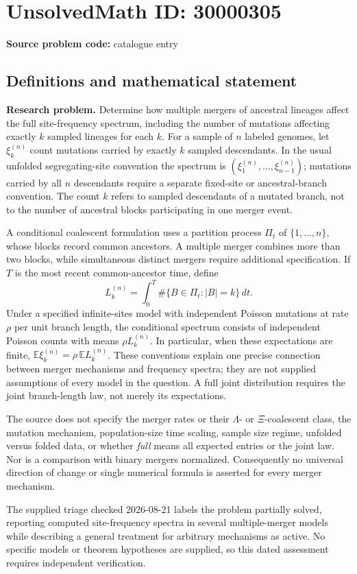 \documentclass[11pt]{article}
\begin{document}
\section*{UnsolvedMath ID: 30000305}
\textbf{Source problem code:} catalogue entry
\subsection{Definitions and mathematical statement}
\textbf{Research problem.} Determine how multiple mergers of ancestral lineages affect the full site-frequency spectrum, including the number of mutations affecting exactly \(k\) sampled lineages for each \(k\). For a sample of \(n\) labeled genomes, let \(\xi_k^{(n)}\) count mutations carried by exactly \(k\) sampled descendants. In the usual unfolded segregating-site convention the spectrum is \((\xi_1^{(n)},\ldots,\xi_{n-1}^{(n)})\); mutations carried by all \(n\) descendants require a separate fixed-site or ancestral-branch convention. The count \(k\) refers to sampled descendants of a mutated branch, not to the number of ancestral blocks participating in one merger event.\par A conditional coalescent formulation uses a partition process \(\Pi_t\) of \(\{1,\ldots,n\}\), whose blocks record common ancestors. A multiple merger combines more than two blocks, while simultaneous distinct mergers require additional specification. If \(T\) is the most recent common-ancestor time, define\[L_k^{(n)}=\int_0^T\#\{B\in\Pi_t:|B|=k\}\,dt.\] Under a specified infinite-sites model with independent Poisson mutations at rate \(\rho\) per unit branch length, the conditional spectrum consists of independent Poisson counts with means \(\rho L_k^{(n)}\). In particular, when these expectations are finite, \(\mathbb E\xi_k^{(n)}=\rho\,\mathbb E L_k^{(n)}\). These conventions explain one precise connection between merger mechanisms and frequency spectra; they are not supplied assumptions of every model in the question. A full joint distribution requires the joint branch-length law, not merely its expectations.\par The source does not specify the merger rates or their \(\Lambda\)- or \(\Xi\)-coalescent class, the mutation mechanism, population-size time scaling, sample size regime, unfolded versus folded data, or whether \emph{full} means all expected entries or the joint law. Nor is a comparison with binary mergers normalized. Consequently no universal direction of change or single numerical formula is asserted for every merger mechanism.\par The supplied triage checked 2026-08-21 labels the problem partially solved, reporting computed site-frequency spectra in several multiple-merger models while describing a general treatment for arbitrary mechanisms as active. No specific models or theorem hypotheses are supplied, so this dated assessment requires independent verification.
\end{document}
